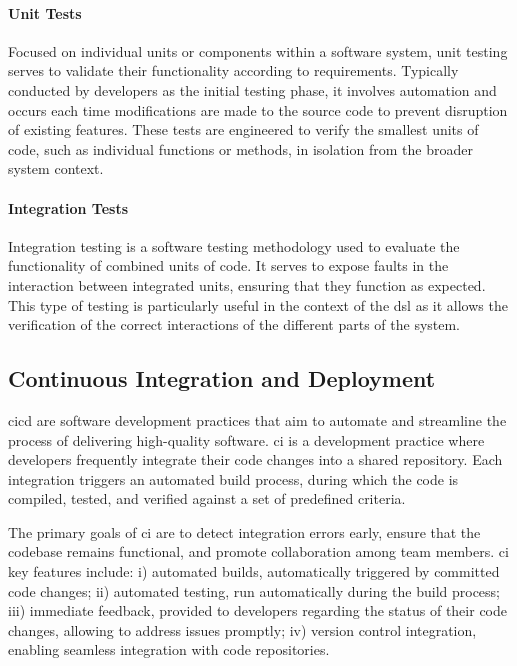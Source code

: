 \paragraph{Unit Tests}
Focused on individual units or components within a software system, unit testing serves to validate their functionality
according to requirements.
Typically conducted by developers as the initial testing phase, it involves automation and occurs each time modifications
are made to the source code to prevent disruption of existing features.
These tests are engineered to verify the smallest units of code, such as individual functions or methods, in isolation
from the broader system context.

\paragraph{Integration Tests}
Integration testing is a software testing methodology used to evaluate the functionality of combined units of code.
It serves to expose faults in the interaction between integrated units, ensuring that they function as expected.
This type of testing is particularly useful in the context of the \ac{dsl} as it allows the verification of the correct
interactions of the different parts of the system.

\subsection{Continuous Integration and Deployment}
\label{subsec:continuous-integration-and-deployment}
\ac{cicd} are software development practices that aim to automate and streamline the process of delivering high-quality software.
\ac{ci} is a development practice where developers frequently integrate their code changes into a shared repository.
Each integration triggers an automated build process, during which the code is compiled, tested, and verified against a
set of predefined criteria.

The primary goals of \ac{ci} are to detect integration errors early, ensure that the codebase remains functional,
and promote collaboration among team members.
\ac{ci} key features include:
    i) automated builds, automatically triggered by committed code changes;
    ii) automated testing, run automatically during the build process;
    iii) immediate feedback, provided to developers regarding the status of their code changes, allowing to address issues promptly;
    iv) version control integration, enabling seamless integration with code repositories.

